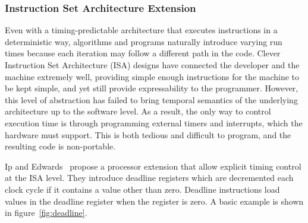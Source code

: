 \documentclass[times, 10pt,twocolumn]{article}
\begin{document}
\subsubsection {Instruction Set Architecture Extension}
Even with a timing-predictable architecture that executes instructions in a deterministic way, algorithms and programs naturally introduce varying run times because each iteration may follow a different path in the code. Clever Instruction Set Architecture (ISA) designs have connected the developer and the machine extremely well, providing simple enough instructions for the machine to be kept simple, and yet still provide expressability to the programmer. However, this level of abstraction has failed to bring temporal semantics of the underlying architecture up to the software level. As a result, the only way to control execution time is through programming external timers and interrupts, which the hardware must support. This is both tedious and difficult to program, and the resulting code is non-portable. 

Ip and Edwards~\cite{ip2006processor} propose a processor extension that allow explicit timing control at the ISA level. They introduce deadline registers which are decremented each clock cycle if it contains a value other than zero. Deadline instructions load values in the deadline register when the register is zero. A basic example is shown in figure~\ref{fig:deadline}.
\end{document}

